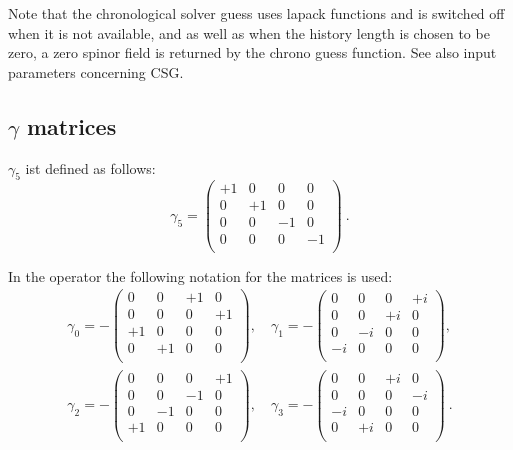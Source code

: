 Note that the chronological solver guess uses lapack functions and is
switched off when it is not available, and as well as when the history
length is chosen to be zero, a zero spinor field is returned by the
chrono guess function. See also input parameters concerning CSG.

\subsection{$\gamma$ matrices}
\label{gammas}
$\gamma_5$ ist defined as follows:
\[
  \gamma_5 =
  \begin{pmatrix}
    +1 & 0 & 0 & 0 \\
    0 & +1 & 0 & 0 \\
    0 & 0 & -1 & 0 \\
    0 & 0 & 0 & -1 \\    
  \end{pmatrix}\ .
\]

In the operator the following notation for
the matrices is used:
\[
\begin{split}
  \gamma_0 = -\begin{pmatrix}
    0 & 0 & +1 & 0 \\
    0 & 0 & 0 & +1 \\
    +1 & 0 & 0 & 0 \\
    0 & +1 & 0 & 0 \\
  \end{pmatrix},\quad
  \gamma_1 = -\begin{pmatrix}
    0 & 0 & 0 & +i \\
    0 & 0 & +i & 0 \\
    0 & -i & 0 & 0 \\
    -i & 0 & 0 & 0 \\    
  \end{pmatrix},\\
  \gamma_2 = -\begin{pmatrix}
    0 & 0 & 0 & +1 \\
    0 & 0 & -1 & 0 \\
    0 & -1 & 0 & 0 \\
    +1 & 0 & 0 & 0 \\   
  \end{pmatrix},\quad
  \gamma_3 = -\begin{pmatrix}
    0 & 0 & +i & 0 \\
    0 & 0 & 0 & -i \\
    -i & 0 & 0 & 0 \\
    0 & +i & 0 & 0 \\
  \end{pmatrix}\ .\\
\end{split}
\]



